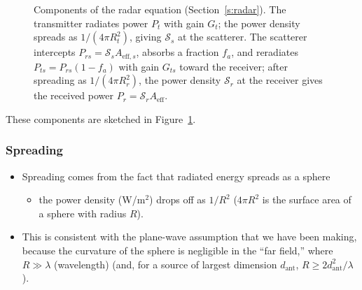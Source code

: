 \documentclass[11pt, oneside]{article}
\begin{document}
\begin{figure}[!htbp]
	\caption{Components of the radar equation (Section~\ref{s:radar}). The transmitter radiates power $P_t$ with gain $G_t$; the power density spreads as $1/(4\pi R_t^2)$, giving $\mathcal{S}_s$ at the scatterer. The scatterer intercepts $P_{rs} = \mathcal{S}_sA_{\mathrm{eff},s}$, absorbs a fraction $f_a$, and reradiates $P_{ts} = P_{rs}(1 - f_a)$ with gain $G_{ts}$ toward the receiver; after spreading as $1/(4\pi R_r^2)$, the power density $\mathcal{S}_r$ at the receiver gives the received power $P_r = \mathcal{S}_rA_\mathrm{eff}$.}
	\label{f:radar}
\end{figure}

These components are sketched in Figure~\ref{f:radar}.

\subsubsection{Spreading}

\begin{itemize}
	\item[$\hookrightarrow$] Spreading comes from the fact that radiated energy spreads as a sphere
	\begin{itemize}
		\item[$\Rightarrow$] the power density (W/m$^2$) %
		drops off as $1/R^2$ ($4\pi R^2$ is the surface area of a sphere with radius $R$).
	\end{itemize}
	\item[$\hookrightarrow$] This is consistent with the plane-wave assumption that we have been making, because the curvature of the sphere is negligible in the ``far field,'' where $R \gg \lambda$ (wavelength) (and, for a source of largest dimension $d_\mathrm{ant}$, $R \ge 2d_\mathrm{ant}^2/\lambda$).
\end{itemize}
\end{document}
